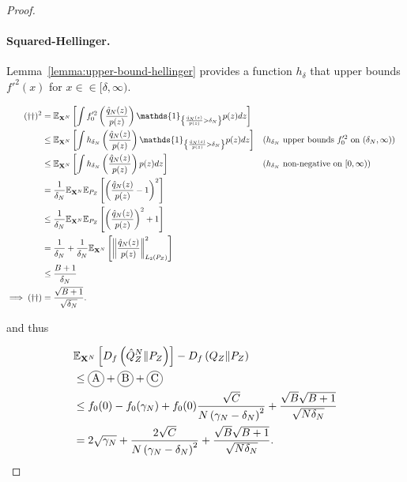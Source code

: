 \begin{proof}
\paragraph{Squared-Hellinger.}
Lemma~\ref{lemma:upper-bound-hellinger} provides a function $h_\delta$ that upper bounds $f'^2(x)$ for $x \in \in[\delta, \infty)$.

\begin{align*}
    (\dagger\dagger)^2 
    &= \E_{\XN} \left[\int f_0'^2\left(\frac{\hat{q}_N(z)}{p(z)} \right) \mathds{1}_{\left\lbrace \frac{\hat{q}_N(z)}{p(z)} > \delta_N \right\rbrace} p(z) dz \right]
    \\
    &\leq \E_{\XN} \left[\int h_{\delta_N}\left(\frac{\hat{q}_N(z)}{p(z)} \right) \mathds{1}_{\left\lbrace \frac{\hat{q}_N(z)}{p(z)} > \delta_N \right\rbrace} p(z) dz \right]
    && \text{($h_{\delta_N}$ upper bounds $f_0'^2$ on $(\delta_N, \infty)$)}
    \\
    &\leq \E_{\XN} \left[\int h_{\delta_N}\left(\frac{\hat{q}_N(z)}{p(z)} \right) p(z) dz \right]
    && \text{($h_{\delta_N}$ non-negative on $[0, \infty)$)}
    \\
    &= \frac{1}{\delta_N} \E_{\XN}\E_{P_Z} \left[ \left(\frac{\hat{q}_N(z)}{p(z)} - 1 \right)^2 \right] \\
    &\leq \frac{1}{\delta_N} \E_{\XN}\E_{P_Z} \left[ \left(\frac{\hat{q}_N(z)}{p(z)}\right)^2 + 1 \right] \\
    &= \frac{1}{\delta_N} + \frac{1}{\delta_N} \E_{\XN}\left[ \left\| \frac{\hat{q}_N(z)}{p(z)}\right\|^2_{L_2(P_Z)} \right]\\
    &\leq \frac{B + 1}{\delta_N} \\
    \implies (\dagger\dagger)&= \frac{\sqrt{B + 1}}{\sqrt{\delta_N}}.
\end{align*}

and thus

\begin{align*}
    &\E_{\XN} \left[ D_f\left( \hat{Q}_Z^N \| P_Z\right)\right] - D_f\left( Q_{Z} \| P_Z\right)\\
    &\leq \encircle{A} + \encircle{B} + \encircle{C} \\
    &\leq f_0(0) - f_0(\gamma_N) + f_0(0) \frac{\sqrt{C}}{N \left( \gamma_N - \delta_N \right)^2} + \frac{\sqrt{B}\sqrt{B + 1}}{\sqrt{N \delta_N}}\\
    &= 2\sqrt{\gamma_N}  + \frac{2\sqrt{C}}{N \left( \gamma_N - \delta_N \right)^2} + \frac{\sqrt{B}\sqrt{B + 1}}{\sqrt{N \delta_N}}.
\end{align*}


\end{proof}
